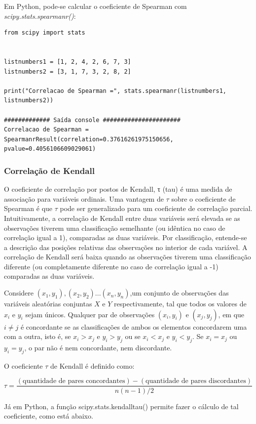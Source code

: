 \documentclass{article}
\begin{document}
 Em Python, pode-se calcular o coeficiente de Spearman com {\it  scipy.stats.spearmanr()}:
 
 \begin{verbatim}
from scipy import stats


listnumbers1 = [1, 2, 4, 2, 6, 7, 3]
listnumbers2 = [3, 1, 7, 3, 2, 8, 2]

print("Correlacao de Spearman =", stats.spearmanr(listnumbers1, listnumbers2))

############# Saída console ######################
Correlacao de Spearman = SpearmanrResult(correlation=0.37616261975150656, pvalue=0.4056106609029061)
 \end{verbatim}
 

\subsubsection{Correlação de Kendall}
O coeficiente de correlação por postos de Kendall, τ (tau) é uma medida de
associação para variáveis ordinais. Uma vantagem de $\tau$ sobre o coeficiente de
Spearman é que $\tau$ pode ser generalizado para um coeficiente de correlação
parcial. Intuitivamente, a correlação de Kendall entre duas variáveis será elevada se as observações tiverem uma classificação semelhante (ou idêntica no caso de correlação igual a 1), comparadas as duas variáveis. Por classificação, entende-se a descrição das posições relativas das observações no interior de cada variável. A correlação de Kendall será baixa quando as observações tiverem uma classificação diferente (ou completamente diferente no caso de correlação igual a -1) comparadas as duas variáveis.

Considere $(x_{1},y_{1}), (x_{2},y_{2})... (x_n, y_n)$,um conjunto de observações das variáveis aleatórias conjuntas $X$ e $Y$ respectivamente, tal que todos os valores de $x_{i}$ e $y_{i}$  sejam únicos. Qualquer par de observações $(x_{i},y_{i})$ e $(x_{j},y_{j})$, em que $i\neq j$ é concordante se as classificações de ambos os elementos concordarem uma com a outra, isto é, se $x_{i} > x_{j}$ e $y_{i} > y_{j}$  ou se $x_{i} < x_{j}$ e $y_{i} < y_{j}$.  Se $x_{i}=x_{j}$ ou $y_{i}=y_{j}$, o par não é nem concordante, nem discordante.

O coeficiente $\tau$ de Kendall é definido como:

$$\tau ={\frac {({\text{quantidade de pares concordantes}})-({\text{quantidade de pares discordantes}})}{n(n-1)/2}}$$

Já em Python, a função {scipy.stats.kendalltau()} permite fazer o cálculo de tal coeficiente, como está abaixo.
\end{document}
